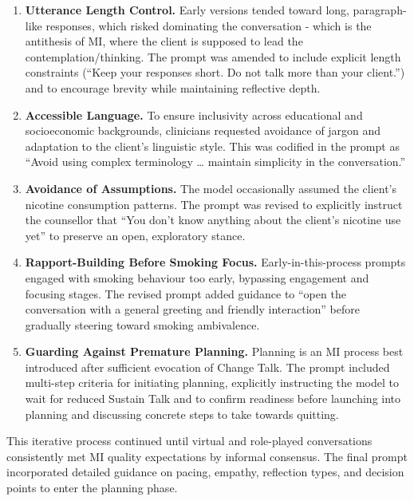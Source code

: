 \begin{enumerate}
    \item \textbf{Utterance Length Control.} Early versions tended toward long, paragraph-like responses, which risked dominating the conversation - which is the antithesis of MI, where the client is supposed to lead the contemplation/thinking.  The prompt was amended to include explicit length constraints (``Keep your responses short. Do not talk more than your client.'') and to encourage brevity while maintaining reflective depth.

    \item \textbf{Accessible Language.} To ensure inclusivity across educational and socioeconomic backgrounds, clinicians requested avoidance of jargon and adaptation to the client's linguistic style. This was codified in the prompt as ``Avoid using complex terminology … maintain simplicity in the conversation.''

    \item \textbf{Avoidance of Assumptions.} The model occasionally assumed the client's nicotine consumption patterns. The prompt was revised to explicitly instruct the counsellor that ``You don't know anything about the client's nicotine use yet'' to preserve an open, exploratory stance.

    \item \textbf{Rapport-Building Before Smoking Focus.} Early-in-this-process prompts engaged with smoking behaviour too early, bypassing engagement and focusing stages. The revised prompt added guidance to ``open the conversation with a general greeting and friendly interaction'' before gradually steering toward smoking ambivalence.

    \item \textbf{Guarding Against Premature Planning.} Planning is an MI process best introduced after sufficient evocation of Change Talk. The prompt included multi-step criteria for initiating planning, explicitly instructing the model to wait for reduced Sustain Talk and to confirm readiness before launching into planning and discussing concrete steps to take towards quitting.

    
\end{enumerate}



This iterative process continued until virtual and role-played conversations consistently met MI quality expectations by informal consensus.   The final prompt incorporated detailed guidance on pacing, empathy, reflection types, and decision points to enter the planning phase.


